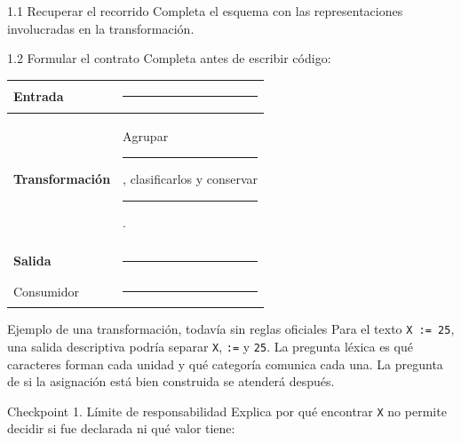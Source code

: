 \documentclass[11pt,spanish]{article}
\newcommand{\blank}[1][4cm]{\rule{#1}{0.4pt}}
\newcommand{\entrada}{\textbf{Entrada}}
\newcommand{\transformacion}{\textbf{Transformación}}
\newcommand{\salida}{\textbf{Salida}}
\begin{document}
\begin{estacion}{1.1 Recuperar el recorrido}
Completa el esquema con las representaciones involucradas en la transformación.
\end{estacion}

\begin{center}
\end{center}

\begin{estacion}{1.2 Formular el contrato}
Completa antes de escribir código:

\begin{center}
\begin{tabular}{|p{}|p{}|}
\hline
\entrada & \blank[9cm] \\[0.45cm]
\hline
\transformacion & Agrupar \blank[3cm], clasificarlos y conservar \blank[3cm]. \\[0.45cm]
\hline
\salida & \blank[9cm] \\[0.45cm]
\hline
Consumidor & \blank[9cm] \\[0.45cm]
\hline
\end{tabular}
\end{center}
\end{estacion}

\begin{modelo}{Ejemplo de una transformación, todavía sin reglas oficiales}
Para el texto \texttt{X := 25}, una salida descriptiva podría separar \texttt{X}, \texttt{:=} y \texttt{25}. La pregunta léxica es qué caracteres forman cada unidad y qué categoría comunica cada una. La pregunta de si la asignación está bien construida se atenderá después.
\end{modelo}

\begin{checkpoint}{Checkpoint 1. Límite de responsabilidad}
Explica por qué encontrar \texttt{X} no permite decidir si fue declarada ni qué valor tiene:

\vspace{1.3cm}
\end{checkpoint}
\end{document}
